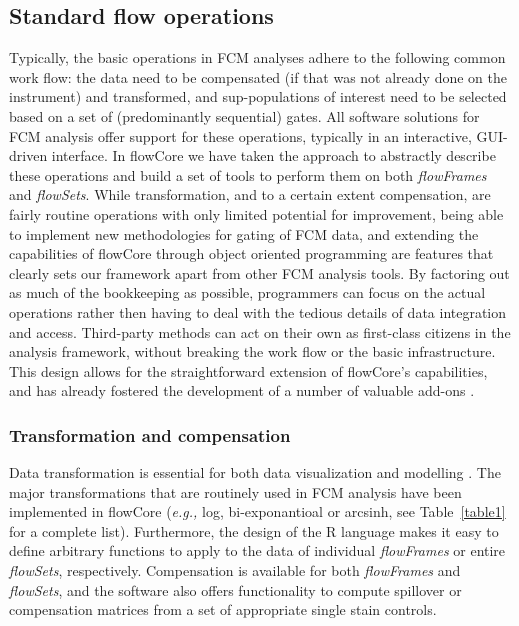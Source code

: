 \documentclass[12pt]{article}
\newcommand{\Rpackage}[1]{{\textsf{#1}}}
\newcommand{\Rclass}[1]{{\textit{#1}}}
\begin{document}
\subsection*{Standard flow operations}

Typically, the basic operations in FCM analyses adhere to the
following common work flow: the data need to be compensated (if that
was not already done on the instrument) and transformed, and
sup-populations of interest need to be selected based on a set of
(predominantly sequential) gates. All software solutions for FCM
analysis offer support for these operations, typically in an
interactive, GUI-driven interface. In \Rpackage{flowCore} we have
taken the approach to abstractly describe these operations and build a
set of tools to perform them on both \Rclass{flowFrames} and
\Rclass{flowSets}. While transformation, and to a certain extent
compensation, are fairly routine operations with only limited
potential for improvement, being able to implement new methodologies
for gating of FCM data, and extending the capabilities of
\Rpackage{flowCore} through object oriented programming are features
that clearly sets our framework apart from other FCM analysis
tools. By factoring out as much of the bookkeeping as possible,
programmers can focus on the actual operations rather then having to
deal with the tedious details of data integration and
access. Third-party methods can act on their own as first-class
citizens in the analysis framework, without breaking the work flow or
the basic infrastructure. This design allows for the straightforward
extension of \Rpackage{flowCore}'s capabilities, and has already
fostered the development of a number of valuable add-ons
\citep{lo2008agf,sarkar2008ufv}.

\subsubsection*{Transformation and compensation}

Data transformation is essential for both data visualization and
modelling \citep{lo2008agf}. The major transformations that are
routinely used in FCM analysis have been implemented in
\Rpackage{flowCore} (\textit{e.g.,} log, bi-exponantioal or arcsinh,
see Table~\ref{table1} for a complete list). Furthermore, the design
of the R language makes it easy to define arbitrary functions to apply
to the data of individual \Rclass{flowFrames} or entire
\Rclass{flowSets}, respectively. Compensation is available for both
\Rclass{flowFrames} and \Rclass{flowSets}, and the software also
offers functionality to compute spillover or compensation matrices
from a set of appropriate single stain controls.
\end{document}
